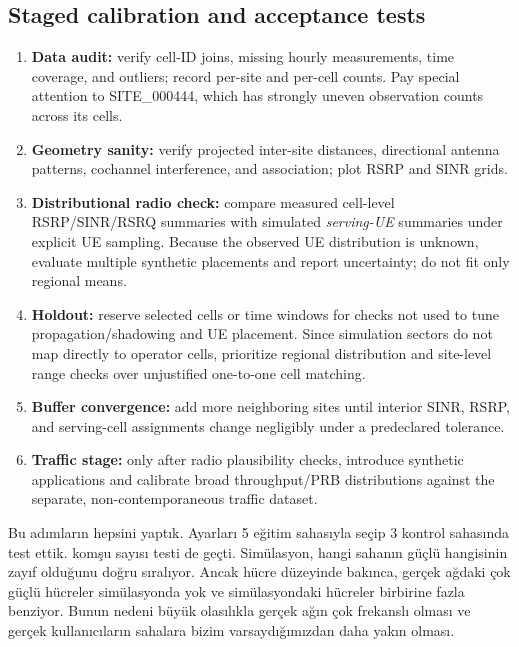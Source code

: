 \documentclass[11pt,a4paper]{article}
\newenvironment{progress}{\par\smallskip\color{blue}}{\par\smallskip}
\begin{document}
\subsection{Staged calibration and acceptance tests}
\begin{enumerate}[leftmargin=*,itemsep=2pt]
\item \textbf{Data audit:} verify cell-ID joins, missing hourly measurements, time coverage, and outliers; record per-site and per-cell counts. Pay special attention to SITE\_000444, which has strongly uneven observation counts across its cells.
\item \textbf{Geometry sanity:} verify projected inter-site distances, directional antenna patterns, cochannel interference, and association; plot RSRP and SINR grids.
\item \textbf{Distributional radio check:} compare measured cell-level RSRP/SINR/RSRQ summaries with simulated \emph{serving-UE} summaries under explicit UE sampling. Because the observed UE distribution is unknown, evaluate multiple synthetic placements and report uncertainty; do not fit only regional means.
\item \textbf{Holdout:} reserve selected cells or time windows for checks not used to tune propagation/shadowing and UE placement. Since simulation sectors do not map directly to operator cells, prioritize regional distribution and site-level range checks over unjustified one-to-one cell matching.
\item \textbf{Buffer convergence:} add more neighboring sites until interior SINR, RSRP, and serving-cell assignments change negligibly under a predeclared tolerance.
\item \textbf{Traffic stage:} only after radio plausibility checks, introduce synthetic applications and calibrate broad throughput/PRB distributions against the separate, non-contemporaneous traffic dataset.
\end{enumerate}

\begin{progress}
Bu adımların hepsini yaptık. Ayarları 5 eğitim sahasıyla seçip 3 kontrol sahasında test ettik. komşu sayısı testi de geçti. Simülasyon, hangi sahanın güçlü hangisinin zayıf olduğunu doğru sıralıyor. Ancak hücre düzeyinde bakınca, gerçek ağdaki çok güçlü hücreler simülasyonda yok ve simülasyondaki hücreler birbirine fazla benziyor. Bunun nedeni büyük olasılıkla gerçek ağın çok frekanslı olması ve gerçek kullanıcıların sahalara bizim varsaydığımızdan daha yakın olması.
\end{progress}
\end{document}
